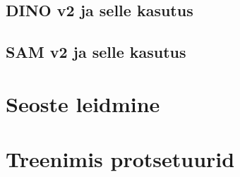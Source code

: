 \subsection{DINO v2 ja selle kasutus}



\subsection{SAM v2  ja selle kasutus}


\section{Seoste leidmine}


\section{Treenimis protsetuurid}


